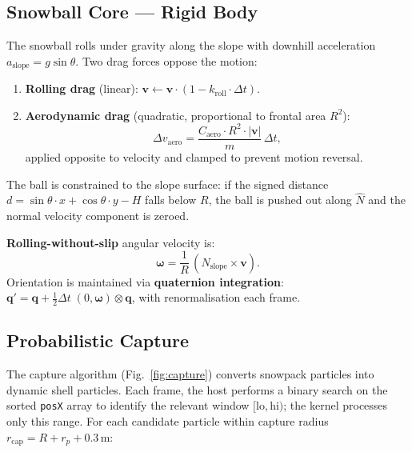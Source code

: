 \subsection{Snowball Core --- Rigid Body}
\label{sec:core_rb}

The snowball rolls under gravity along the slope with downhill acceleration
$a_{\text{slope}} = g\sin\theta$. Two drag forces oppose the motion:
%
\begin{enumerate}
  \item \textbf{Rolling drag} (linear): $\mathbf{v} \leftarrow \mathbf{v}
        \cdot (1 - k_{\text{roll}} \cdot \Delta t)$.
  \item \textbf{Aerodynamic drag} (quadratic, proportional to frontal area
        $R^2$):
        \begin{equation}
          \Delta v_{\text{aero}} = \frac{C_{\text{aero}} \cdot R^{2}
          \cdot |\mathbf{v}|}{m}\,\Delta t,
          \label{eq:aero_drag}
        \end{equation}
        applied opposite to velocity and clamped to prevent motion reversal.
\end{enumerate}
%
The ball is constrained to the slope surface: if the signed distance
$d = \sin\theta \cdot x + \cos\theta \cdot y - H$ falls below $R$, the ball is
pushed out along $\hat{N}$ and the normal velocity component is zeroed.

\textbf{Rolling-without-slip} angular velocity is:
%
\begin{equation}
  \boldsymbol{\omega} = \frac{1}{R}\,(\hat{N}_{\text{slope}} \times
  \mathbf{v}).
  \label{eq:omega}
\end{equation}
%
Orientation is maintained via \textbf{quaternion integration}:
$\mathbf{q}' = \mathbf{q} + \tfrac{1}{2}\Delta t\;(0,\boldsymbol{\omega})
\otimes \mathbf{q}$, with renormalisation each frame.

\subsection{Probabilistic Capture}
\label{sec:capture}

The capture algorithm (Fig.~\ref{fig:capture}) converts snowpack particles into dynamic shell particles.
Each frame, the host performs a binary search on the sorted \texttt{posX} array
to identify the relevant window $[\text{lo}, \text{hi})$; the kernel processes
only this range. For each candidate particle within capture radius
$r_{\text{cap}} = R + r_p + 0.3$\,m:

